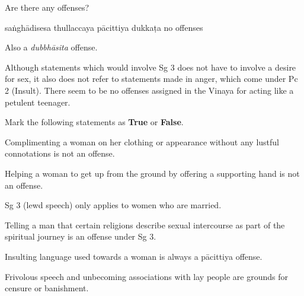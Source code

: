 \begin{exam}{\autoExamName}
\begin{problem}
  Are there any offenses?

  \begin{answers}{5}
    \bChoices
     saṅghādisesa\eAns
     thullaccaya\eAns
     pācittiya\eAns
     dukkaṭa\eAns
     no offenses\eAns
    \eChoices
  \end{answers}

  \begin{solution}
    Also a \emph{dubbhāsita} offense.

    Although statements which would involve Sg 3 does not have to involve a desire for sex,
    it also does not refer to statements made in anger, which come under Pc 2 (Insult).
    There seem to be no offenses assigned in the Vinaya for acting like a petulent teenager.
  \end{solution}

\end{problem}

\problemDivide

\begin{problem*}

  Mark the following statements as \textbf{True} or \textbf{False}.

  \bigskip

  \begin{parts}

    \item {} Complimenting a woman on her clothing or appearance without any
    lustful connotations is not an offense.

    \bigskip

    \item {} Helping a woman to get up from the ground by offering a
    supporting hand is not an offense.

    \bigskip

    \item {} Sg 3 (lewd speech) only applies to women who are married.

    \bigskip

    \item {} Telling a man that certain religions describe sexual
    intercourse as part of the spiritual journey is an offense under Sg 3.

    \bigskip

    \item {} Insulting language used towards a woman is always a pācittiya offense.

    \bigskip

    \item {} Frivolous speech and unbecoming associations with lay people
    are grounds for censure or banishment.

  \end{parts}

\end{problem*}

\end{exam}


